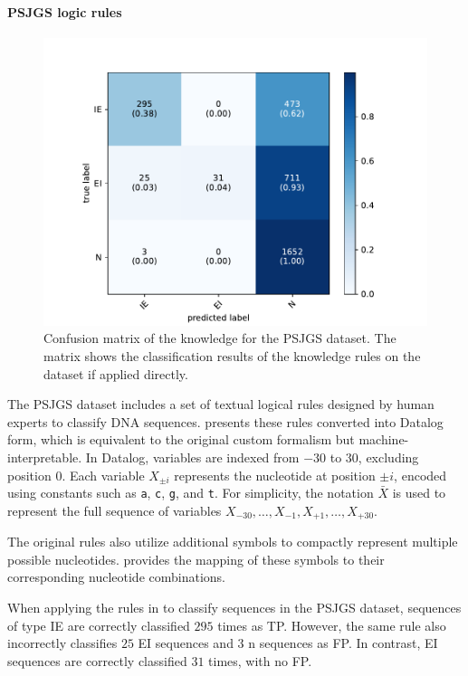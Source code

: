 \paragraph{\gls{PSJGS} logic rules}\label{par:kins-psjgs-logic-rules}
%

%
\begin{figure}
    \centering
    \includegraphics[width=0.8\linewidth]{figures/psjgs-rules-confusion-matrix}
    \caption[Confusion matrix of the knowledge for the PSJGS dataset]{
        Confusion matrix of the knowledge for the \gls{PSJGS} dataset.
        The matrix shows the classification results of the knowledge rules on the dataset if applied directly.
    }
    \label{fig:psjgs-rules-confusion-matrix}
\end{figure}
%
The \gls{PSJGS} dataset includes a set of textual logical rules designed by human experts to classify DNA sequences.
%
 presents these rules converted into Datalog form, which is equivalent to the original custom formalism but machine-interpretable.
%
In Datalog, variables are indexed from $-30$ to $30$, excluding position $0$.
%
Each variable $X_{\pm i}$ represents the nucleotide at position $\pm i$, encoded using constants such as \texttt{a}, \texttt{c}, \texttt{g}, and \texttt{t}.
%
For simplicity, the notation $\bar{X}$ is used to represent the full sequence of variables $X_{-30}, \dots, X_{-1}, X_{+1}, \dots, X_{+30}$.

The original rules also utilize additional symbols to compactly represent multiple possible nucleotides.
%
 provides the mapping of these symbols to their corresponding nucleotide combinations.

When applying the rules in  to classify sequences in the \gls{PSJGS} dataset, sequences of type \gls{IE} are correctly classified $295$ times as \gls{TP}.
%
However, the same rule also incorrectly classifies $25$ \gls{EI} sequences and $3$ \gls{n} sequences as \gls{FP}.
%
In contrast, \gls{EI} sequences are correctly classified $31$ times, with no \gls{FP}.

